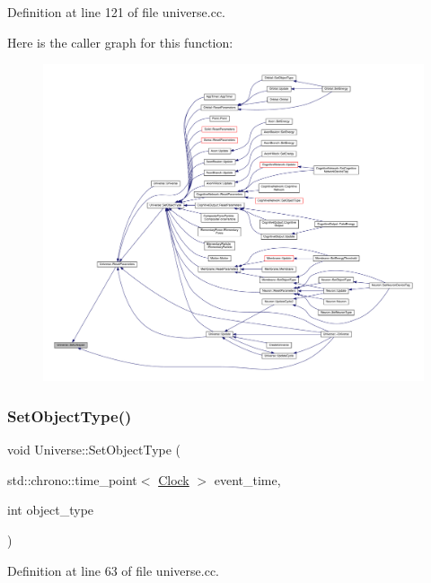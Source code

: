 Definition at line 121 of file universe.\+cc.

Here is the caller graph for this function\+:
\nopagebreak
\begin{figure}[H]
\begin{center}
\leavevmode
\includegraphics[width=350pt]{class_universe_ac3443dd59b61ae3110f07f681f63ed0a_icgraph}
\end{center}
\end{figure}
\mbox{\label{class_universe_a2274a54fbdc7504c897e4272162bf17a}} 
\subsubsection{\texorpdfstring{Set\+Object\+Type()}{SetObjectType()}}
{\footnotesize\ttfamily void Universe\+::\+Set\+Object\+Type (\begin{DoxyParamCaption}\item[{std\+::chrono\+::time\+\_\+point$<$ \hyperlink{universe_8h_a0ef8d951d1ca5ab3cfaf7ab4c7a6fd80}{Clock} $>$}]{event\+\_\+time,  }\item[{int}]{object\+\_\+type }\end{DoxyParamCaption})}



Definition at line 63 of file universe.\+cc.

